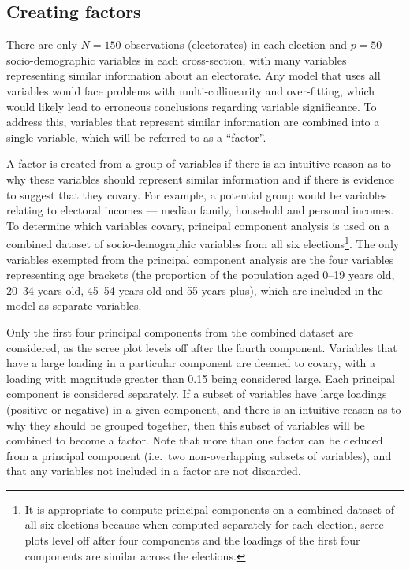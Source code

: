 \documentclass[times, doublespace]{anzsauth}
\let\rmarkdownfootnote\footnote%
\def\footnote{\protect\rmarkdownfootnote}
\begin{document}
\hypertarget{creating-factors}{%
\subsection{Creating factors}\label{creating-factors}}

There are only \(N = 150\) observations (electorates) in each election and \(p = 50\) socio-demographic variables in each cross-section, with many variables representing similar information about an electorate. Any model that uses all variables would face problems with multi-collinearity and over-fitting, which would likely lead to erroneous conclusions regarding variable significance. To address this, variables that represent similar information are combined into a single variable, which will be referred to as a ``factor''.

A factor is created from a group of variables if there is an intuitive reason as to why these variables should represent similar information and if there is evidence to suggest that they covary. For example, a potential group would be variables relating to electoral incomes --- median family, household and personal incomes. To determine which variables covary, principal component analysis is used on a combined dataset of socio-demographic variables from all six elections\footnote{It is appropriate to compute principal components on a combined dataset of all six elections because when computed separately for each election, scree plots level off after four components and the loadings of the first four components are similar across the elections.}. The only variables exempted from the principal component analysis are the four variables representing age brackets (the proportion of the population aged 0--19 years old, 20--34 years old, 45--54 years old and 55 years plus), which are included in the model as separate variables.

Only the first four principal components from the combined dataset are considered, as the scree plot levels off after the fourth component. Variables that have a large loading in a particular component are deemed to covary, with a loading with magnitude greater than 0.15 being considered large. Each principal component is considered separately. If a subset of variables have large loadings (positive or negative) in a given component, and there is an intuitive reason as to why they should be grouped together, then this subset of variables will be combined to become a factor. Note that more than one factor can be deduced from a principal component (i.e.~two non-overlapping subsets of variables), and that any variables not included in a factor are not discarded.
\end{document}
